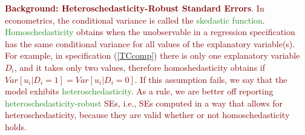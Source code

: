 \documentclass{article}
\begin{document}
\noindent \textcolor{Maroon}{\textbf{Background: Heteroschedasticity-Robust Standard Errors}. In econometrics, the conditional variance is called the \textcolor{ForestGreen}{skedastic function}. \textcolor{ForestGreen}{Homoschedasticity} obtains when the unobservable in a regression specification has the same conditional variance for all values of the explanatory variable(s). For example, in specification (\ref{TCcomp}) there is only one explanatory variable $D_i$, and it takes only two values, therefore homoshedasticity obtains if $Var[u_i|D_i=1]=Var[u_i|D_i=0]$. If this assumption fails, we say that the model exhibits \textcolor{ForestGreen}{heteroschedasticity}. As a rule, we are better off reporting \textcolor{ForestGreen}{heteroschedasticity-robust} SEs, i.e.,  SEs computed in a way that allows for heteroschedasticity, because they are valid whether or not homoschedasticity holds.}\\
\end{document}
